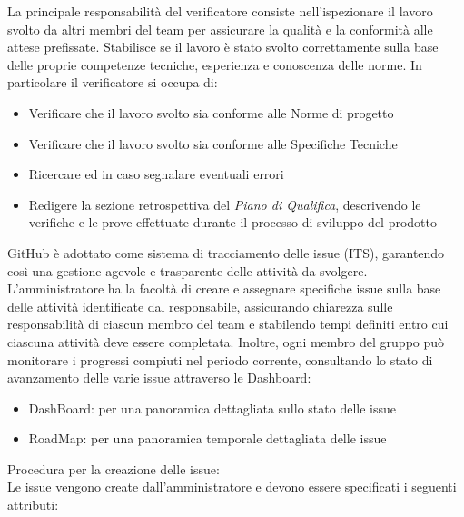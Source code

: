 La principale responsabilità del verificatore consiste nell’ispezionare il lavoro svolto da altri membri del team per assicurare la qualità e la conformità alle attese prefissate. Stabilisce se il lavoro è stato svolto correttamente sulla base delle proprie competenze tecniche, esperienza e conoscenza delle norme.
In particolare il verificatore si occupa di:
\begin{itemize}
    \item Verificare che il lavoro svolto sia conforme alle Norme di progetto
    \item Verificare che il lavoro svolto sia conforme alle Specifiche Tecniche
    \item Ricercare ed in caso segnalare eventuali errori
    \item Redigere la sezione retrospettiva del \textit{Piano di Qualifica}, descrivendo le verifiche e le prove effettuate durante il processo di sviluppo del prodotto
\end{itemize}
GitHub è adottato come sistema di tracciamento delle issue (ITS), garantendo così una gestione agevole e trasparente delle attività da svolgere.
L’amministratore ha la facoltà di creare e assegnare specifiche issue sulla base delle attività identificate dal responsabile, assicurando chiarezza sulle responsabilità di ciascun membro del team e stabilendo tempi definiti entro cui ciascuna attività deve essere completata. Inoltre, ogni membro del gruppo può monitorare i progressi compiuti nel periodo corrente, consultando lo stato di avanzamento delle varie issue attraverso le Dashboard:
\begin{itemize}
    \item DashBoard: per una panoramica dettagliata sullo stato delle issue
    \item RoadMap: per una panoramica temporale dettagliata delle issue
\end{itemize}
Procedura per la creazione delle issue:\\
Le issue vengono create dall’amministratore e devono essere specificati i seguenti attributi:
